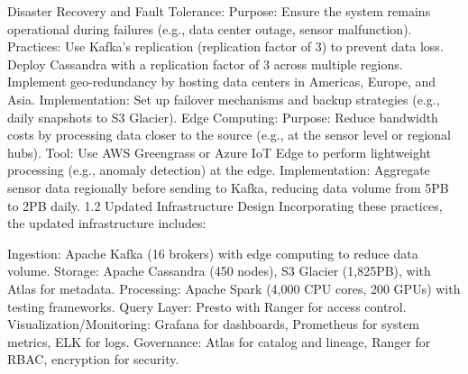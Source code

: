 \documentclass[10pt]{article}
\begin{document}
Disaster Recovery and Fault Tolerance:
Purpose: Ensure the system remains operational during failures (e.g., data center outage, sensor malfunction).
Practices:
Use Kafka’s replication (replication factor of 3) to prevent data loss.
Deploy Cassandra with a replication factor of 3 across multiple regions.
Implement geo-redundancy by hosting data centers in Americas, Europe, and Asia.
Implementation: Set up failover mechanisms and backup strategies (e.g., daily snapshots to S3 Glacier).
Edge Computing:
Purpose: Reduce bandwidth costs by processing data closer to the source (e.g., at the sensor level or regional hubs).
Tool: Use AWS Greengrass or Azure IoT Edge to perform lightweight processing (e.g., anomaly detection) at the edge.
Implementation: Aggregate sensor data regionally before sending to Kafka, reducing data volume from 5PB to 2PB daily.
1.2 Updated Infrastructure Design
Incorporating these practices, the updated infrastructure includes:

Ingestion: Apache Kafka (16 brokers) with edge computing to reduce data volume.
Storage: Apache Cassandra (450 nodes), S3 Glacier (1,825PB), with Atlas for metadata.
Processing: Apache Spark (4,000 CPU cores, 200 GPUs) with testing frameworks.
Query Layer: Presto with Ranger for access control.
Visualization/Monitoring: Grafana for dashboards, Prometheus for system metrics, ELK for logs.
Governance: Atlas for catalog and lineage, Ranger for RBAC, encryption for security.
\end{document}
